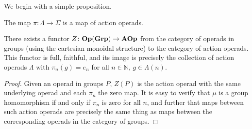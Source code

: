 
We begin with a simple proposition.

\begin{prop}
The map $\pi \colon \Lambda \rightarrow \Sigma$ is a map of action operads.
\end{prop}


\begin{prop}\label{Z}
There exists a functor $Z \colon  \mathbf{Op}(\mathbf{Grp}) \rightarrow \mathbf{AOp}$ from the category of operads in groups (using the cartesian monoidal structure) to the category of action operads. This functor is full, faithful, and its image is precisely the collection of action operads $\Lambda$ with $\pi_{n}(g) = e_{n}$ for all $n \in \mathbb{N}$, $g \in \Lambda(n)$.
\end{prop}
\begin{proof}
Given an operad in groups $P$, $Z(P)$ is the action operad with the same underlying operad and each $\pi_{n}$ the zero map. It is easy to verify that $\mu$ is a group homomorphism if and only if $\pi_{n}$ is zero for all $n$, and further that maps between such action operads are precisely the same thing as maps between the corresponding operads in the category of groups.
\end{proof}

